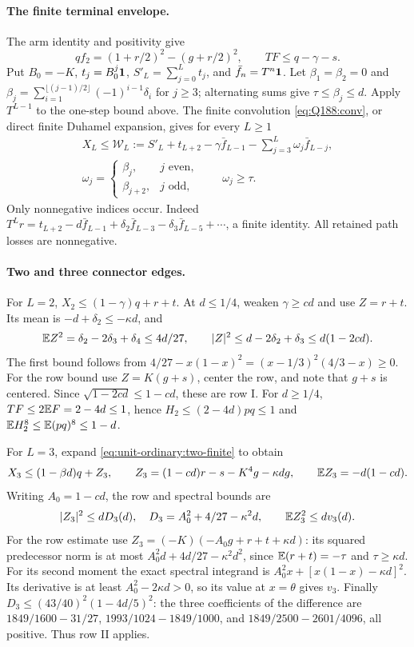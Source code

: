 \paragraph{The finite terminal envelope.}
The arm identity and positivity give
\[
 qf_2=(1+r/2)^2-(g+r/2)^2,\qquad
 TF\le q-\gamma-s.
\]
Put \(B_0=-K\), \(t_j=B_0^j\mathbf1\),
\(S'_L=\sum_{j=0}^Lt_j\), and \(\bar f_n=T^n\mathbf1\).
Let \(\beta_1=\beta_2=0\) and
\(\beta_j=\sum_{i=1}^{\lfloor(j-1)/2\rfloor}(-1)^{i-1}\delta_i\)
for \(j\ge3\); alternating sums give \(\tau\le\beta_j\le d\).
Apply \(T^{L-1}\) to the one-step bound above. The finite convolution
\eqref{eq:Q188:conv}, or direct finite Duhamel expansion, gives for
every \(L\ge1\)
\begin{equation}\label{eq:unit-ordinary:two-finite}
 \begin{gathered}
 X_L\le\mathcal W_L:=S'_L+t_{L+2}-\gamma\bar f_{L-1}
                    -\sum_{j=3}^L\omega_j\bar f_{L-j},\\
 \omega_j=\begin{cases}\beta_j,&j\text{ even},\\
                         \beta_{j+2},&j\text{ odd},\end{cases}
 \qquad\omega_j\ge\tau.
 \end{gathered}
\end{equation}
Only nonnegative indices occur. Indeed
\(T^Lr=t_{L+2}-d\bar f_{L-1}+\delta_2\bar f_{L-3}
-\delta_3\bar f_{L-5}+\cdots\), a finite identity.
All retained path losses are nonnegative.

\paragraph{Two and three connector edges.}
For \(L=2\), \(X_2\le(1-\gamma)q+r+t\).
At \(d\le1/4\), weaken \(\gamma\ge cd\) and use
\(Z=r+t\). Its mean is \(-d+\delta_2\le-\kappa d\), and
\[
 \mathbb E Z^2=\delta_2-2\delta_3+\delta_4\le4d/27,
 \qquad |Z|^2\le d-2\delta_2+\delta_3
                  \le d(1-2cd).
\]
The first bound follows from
\(4/27-x(1-x)^2=(x-1/3)^2(4/3-x)\ge0\).
For the row bound use \(Z=K(g+s)\), center the row, and note that
\(g+s\) is centered. Since
\(\sqrt{1-2cd}\le1-cd\), these are row I.
For \(d\ge1/4\), \(TF\le2\mathbb E F=2-4d\le1\), hence
\(H_2\le(2-4d)pq\le1\) and
\(\mathbb E H_2^8\le\mathbb E(pq)^8\le1-d\).

For \(L=3\), expand \eqref{eq:unit-ordinary:two-finite} to obtain
\[
 X_3\le(1-\beta d)q+Z_3,\qquad
 Z_3=(1-cd)r-s-K^4g-\kappa dg,
 \qquad\mathbb E Z_3=-d(1-cd).
\]
Writing \(A_0=1-cd\), the row and spectral bounds are
\[
 |Z_3|^2\le dD_3(d),\quad
 D_3=A_0^2+4/27-\kappa^2d,
 \qquad \mathbb E Z_3^2\le d v_3(d).
\]
For the row estimate use
\(Z_3=(-K)(-A_0g+r+t+\kappa d)\): its squared predecessor norm
is at most \(A_0^2d+4d/27-\kappa^2d^2\), since
\(\mathbb E(r+t)=-\tau\) and \(\tau\ge\kappa d\).
For its second moment the exact spectral integrand is
\(A_0^2x+[x(1-x)-\kappa d]^2\).
Its derivative is at least \(A_0^2-2\kappa d>0\), so its value
at \(x=\theta\) gives \(v_3\).
Finally \(D_3\le(43/40)^2(1-4d/5)^2\): the three coefficients
of the difference are
\(1849/1600-31/27\),
\(1993/1024-1849/1000\), and
\(1849/2500-2601/4096\), all positive. Thus row II applies.

